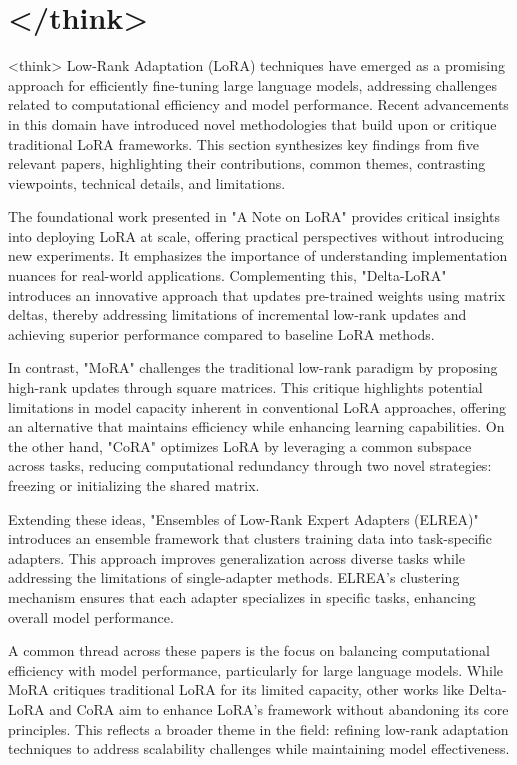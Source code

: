 \documentclass[conference]{IEEEtran}
\begin{document}
\section{</think>}
<think>
Low-Rank Adaptation (LoRA) techniques have emerged as a promising approach for efficiently fine-tuning large language models, addressing challenges related to computational efficiency and model performance. Recent advancements in this domain have introduced novel methodologies that build upon or critique traditional LoRA frameworks. This section synthesizes key findings from five relevant papers, highlighting their contributions, common themes, contrasting viewpoints, technical details, and limitations.

The foundational work presented in "A Note on LoRA" provides critical insights into deploying LoRA at scale, offering practical perspectives without introducing new experiments. It emphasizes the importance of understanding implementation nuances for real-world applications. Complementing this, "Delta-LoRA" introduces an innovative approach that updates pre-trained weights using matrix deltas, thereby addressing limitations of incremental low-rank updates and achieving superior performance compared to baseline LoRA methods.

In contrast, "MoRA" challenges the traditional low-rank paradigm by proposing high-rank updates through square matrices. This critique highlights potential limitations in model capacity inherent in conventional LoRA approaches, offering an alternative that maintains efficiency while enhancing learning capabilities. On the other hand, "CoRA" optimizes LoRA by leveraging a common subspace across tasks, reducing computational redundancy through two novel strategies: freezing or initializing the shared matrix.

Extending these ideas, "Ensembles of Low-Rank Expert Adapters (ELREA)" introduces an ensemble framework that clusters training data into task-specific adapters. This approach improves generalization across diverse tasks while addressing the limitations of single-adapter methods. ELREA's clustering mechanism ensures that each adapter specializes in specific tasks, enhancing overall model performance.

A common thread across these papers is the focus on balancing computational efficiency with model performance, particularly for large language models. While MoRA critiques traditional LoRA for its limited capacity, other works like Delta-LoRA and CoRA aim to enhance LoRA's framework without abandoning its core principles. This reflects a broader theme in the field: refining low-rank adaptation techniques to address scalability challenges while maintaining model effectiveness.
\end{document}
